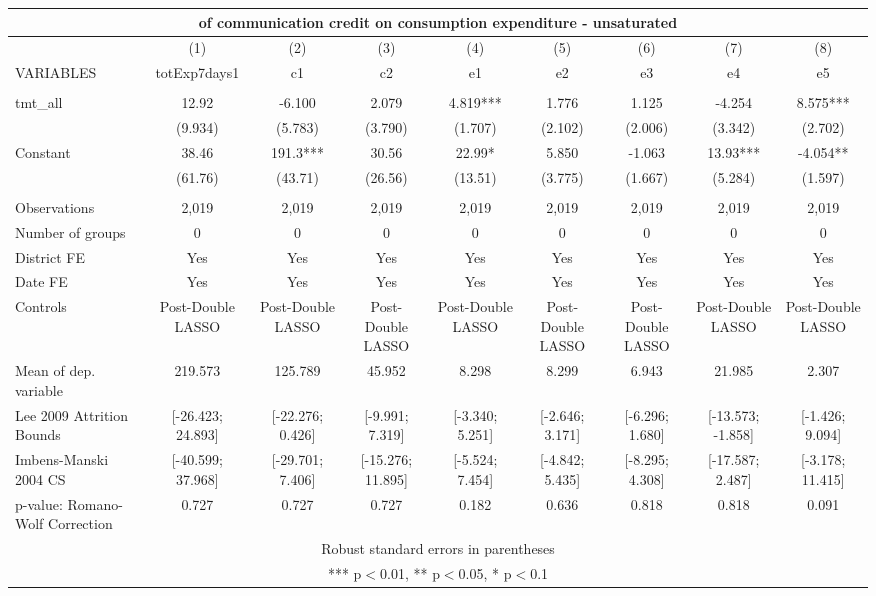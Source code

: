 \documentclass[]{article}
\begin{document}
\begin{tabular}{lcccccccc}
\multicolumn{9}{c}{ of communication credit on consumption expenditure - unsaturated} \\ \hline
 & (1) & (2) & (3) & (4) & (5) & (6) & (7) & (8) \\
VARIABLES & totExp7days1 & c1 & c2 & e1 & e2 & e3 & e4 & e5 \\ \hline
 &  &  &  &  &  &  &  &  \\
tmt\_all & 12.92 & -6.100 & 2.079 & 4.819*** & 1.776 & 1.125 & -4.254 & 8.575*** \\
 & (9.934) & (5.783) & (3.790) & (1.707) & (2.102) & (2.006) & (3.342) & (2.702) \\
Constant & 38.46 & 191.3*** & 30.56 & 22.99* & 5.850 & -1.063 & 13.93*** & -4.054** \\
 & (61.76) & (43.71) & (26.56) & (13.51) & (3.775) & (1.667) & (5.284) & (1.597) \\
 &  &  &  &  &  &  &  &  \\
Observations & 2,019 & 2,019 & 2,019 & 2,019 & 2,019 & 2,019 & 2,019 & 2,019 \\
Number of groups & 0 & 0 & 0 & 0 & 0 & 0 & 0 & 0 \\
District FE & Yes & Yes & Yes & Yes & Yes & Yes & Yes & Yes \\
Date FE & Yes & Yes & Yes & Yes & Yes & Yes & Yes & Yes \\
Controls & Post-Double LASSO & Post-Double LASSO & Post-Double LASSO & Post-Double LASSO & Post-Double LASSO & Post-Double LASSO & Post-Double LASSO & Post-Double LASSO \\
Mean of dep. variable & 219.573 & 125.789 & 45.952 & 8.298 & 8.299 & 6.943 & 21.985 & 2.307 \\
Lee 2009 Attrition Bounds & [-26.423; 24.893] & [-22.276; 0.426] & [-9.991; 7.319] & [-3.340; 5.251] & [-2.646; 3.171] & [-6.296; 1.680] & [-13.573; -1.858] & [-1.426; 9.094] \\
Imbens-Manski 2004 CS & [-40.599; 37.968] & [-29.701; 7.406] & [-15.276; 11.895] & [-5.524; 7.454] & [-4.842; 5.435] & [-8.295; 4.308] & [-17.587; 2.487] & [-3.178; 11.415] \\
 p-value: Romano-Wolf Correction & 0.727 & 0.727 & 0.727 & 0.182 & 0.636 & 0.818 & 0.818 & 0.091 \\ \hline
\multicolumn{9}{c}{ Robust standard errors in parentheses} \\
\multicolumn{9}{c}{ *** p$<$0.01, ** p$<$0.05, * p$<$0.1} \\
\end{tabular}
\end{document}
